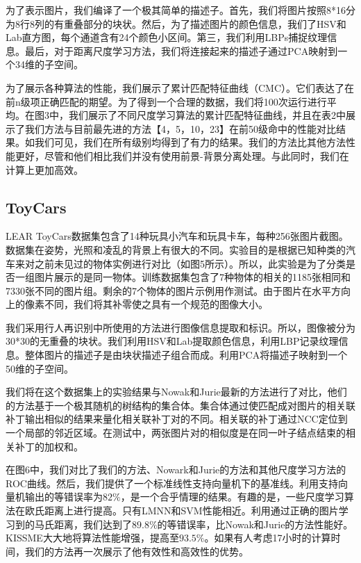 为了表示图片，我们编译了一个极其简单的描述子。首先，我们将图片按照8*16分为8行8列的有重叠部分的块状。然后，为了描述图片的颜色信息，我们了HSV和Lab直方图，每个通道含有24个颜色小区间。第三，我们利用LBPs捕捉纹理信息。最后，对于距离尺度学习方法，我们将连接起来的描述子通过PCA映射到一个34维的子空间。

为了展示各种算法的性能，我们展示了累计匹配特征曲线（CMC）。它们表达了在前n级项正确匹配的期望。为了得到一个合理的数据，我们将100次运行进行平均。在图3中，我们展示了不同尺度学习算法的累计匹配特征曲线，并且在表2中展示了我们方法与目前最先进的方法【4，5，10，23】在前50级命中的性能对比结果。如我们可见，我们在所有级别均得到了有力的结果。我们的方法比其他方法性能更好，尽管和他们相比我们并没有使用前景-背景分离处理。与此同时，我们在计算上更加高效。
\subsection{ToyCars}

LEAR ToyCars数据集包含了14种玩具小汽车和玩具卡车，每种256张图片截图。数据集在姿势，光照和凌乱的背景上有很大的不同。实验目的是根据已知种类的汽车来对之前未见过的物体实例进行对比（如图5所示）。所以，此实验是为了分类是否一组图片展示的是同一物体。训练数据集包含了7种物体的相关的1185张相同和7330张不同的图片组。剩余的7个物体的图片示例用作测试。由于图片在水平方向上的像素不同，我们将其补零使之具有一个规范的图像大小。

我们采用行人再识别中所使用的方法进行图像信息提取和标识。所以，图像被分为30*30的无重叠的块状。我们利用HSV和Lab提取颜色信息，利用LBP记录纹理信息。整体图片的描述子是由块状描述子组合而成。利用PCA将描述子映射到一个50维的子空间。

我们将在这个数据集上的实验结果与Nowak和Jurie最新的方法进行了对比，他们的方法基于一个极其随机的树结构的集合体。集合体通过使匹配成对图片的相关联补丁输出相似的结果来量化相关联补丁对的不同。相关联的补丁通过NCC定位到一个局部的邻近区域。在测试中，两张图片对的相似度是在同一叶子结点结束的相关补丁的加权和。

在图6中，我们对比了我们的方法、Nowark和Jurie的方法和其他尺度学习方法的ROC曲线。然后，我们提供了一个标准线性支持向量机下的基准线。利用支持向量机输出的等错误率为$82\%$，是一个合乎情理的结果。有趣的是，一些尺度学习算法在欧氏距离上进行提高。只有LMNN和SVM性能相近。利用通过正确的图片学习到的马氏距离，我们达到了$89.8\%$的等错误率，比Nowak和Jurie的方法性能好。KISSME大大地将算法性能增强，提高至$93.5\%$。如果有人考虑17小时的计算时间，我们的方法再一次展示了他有效性和高效性的优势。

